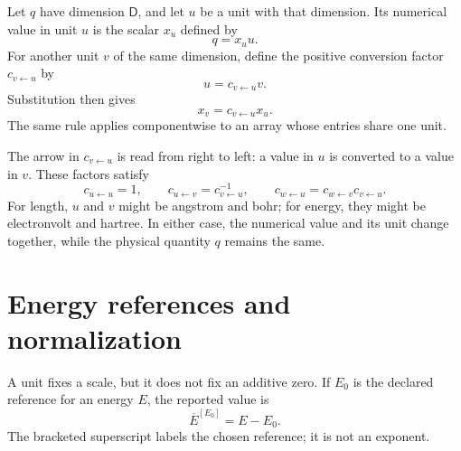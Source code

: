 \begin{definition}
\label{def:training-dimensional-representation}
Let \(q\) have dimension \(\mathsf D\), and let \(u\) be a unit with that
dimension. Its numerical value in unit \(u\) is the scalar \(x_u\) defined by
\begin{equation}
  q=x_u u.
  \label{eq:training-quantity-unit-representation}
\end{equation}
For another unit \(v\) of the same dimension, define the positive conversion
factor \(c_{v\leftarrow u}\) by
\begin{equation}
  u=c_{v\leftarrow u}v.
\end{equation}
Substitution then gives
\begin{equation}
  x_v=c_{v\leftarrow u}x_u.
  \label{eq:training-explicit-unit-conversion}
\end{equation}
The same rule applies componentwise to an array whose entries share one unit.
\end{definition}

The arrow in \(c_{v\leftarrow u}\) is read from right to left: a value in
\(u\) is converted to a value in \(v\). These factors satisfy
\begin{equation}
  c_{u\leftarrow u}=1,
  \qquad
  c_{u\leftarrow v}=c_{v\leftarrow u}^{-1},
  \qquad
  c_{w\leftarrow u}
  =c_{w\leftarrow v}c_{v\leftarrow u}.
  \label{eq:training-unit-conversion-composition}
\end{equation}
For length, \(u\) and \(v\) might be angstrom and bohr; for energy, they might
be electronvolt and hartree. In either case, the numerical value and its unit
change together, while the physical quantity \(q\) remains the same.

\section{Energy references and normalization}

A unit fixes a scale, but it does not fix an additive zero. If \(E_0\) is the
declared reference for an energy \(E\), the reported value is
\begin{equation}
  \overline E^{[E_0]}=E-E_0.
  \label{eq:training-referenced-energy}
\end{equation}
The bracketed superscript labels the chosen reference; it is not an exponent.

